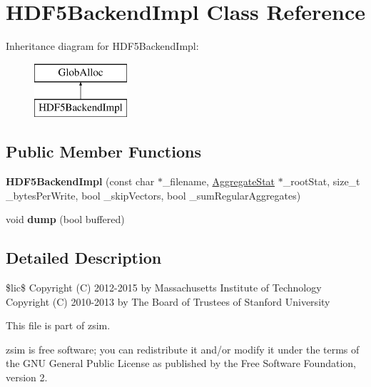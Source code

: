 \hypertarget{classHDF5BackendImpl}{\section{H\-D\-F5\-Backend\-Impl Class Reference}
\label{classHDF5BackendImpl}
}
Inheritance diagram for H\-D\-F5\-Backend\-Impl\-:\begin{figure}[H]
\begin{center}
\leavevmode
\includegraphics[height=2.000000cm]{classHDF5BackendImpl}
\end{center}
\end{figure}
\subsection*{Public Member Functions}
\begin{DoxyCompactItemize}
\item 
\hypertarget{classHDF5BackendImpl_a43a2ce26bf80e7bf7f8153fb9363c34c}{{\bfseries H\-D\-F5\-Backend\-Impl} (const char $\ast$\-\_\-filename, \hyperlink{classAggregateStat}{Aggregate\-Stat} $\ast$\-\_\-root\-Stat, size\-\_\-t \-\_\-bytes\-Per\-Write, bool \-\_\-skip\-Vectors, bool \-\_\-sum\-Regular\-Aggregates)}\label{classHDF5BackendImpl_a43a2ce26bf80e7bf7f8153fb9363c34c}

\item 
\hypertarget{classHDF5BackendImpl_a8d892e64826c093bcd9e456278f3422e}{void {\bfseries dump} (bool buffered)}\label{classHDF5BackendImpl_a8d892e64826c093bcd9e456278f3422e}

\end{DoxyCompactItemize}


\subsection{Detailed Description}
\$lic\$ Copyright (C) 2012-\/2015 by Massachusetts Institute of Technology Copyright (C) 2010-\/2013 by The Board of Trustees of Stanford University

This file is part of zsim.

zsim is free software; you can redistribute it and/or modify it under the terms of the G\-N\-U General Public License as published by the Free Software Foundation, version 2.

